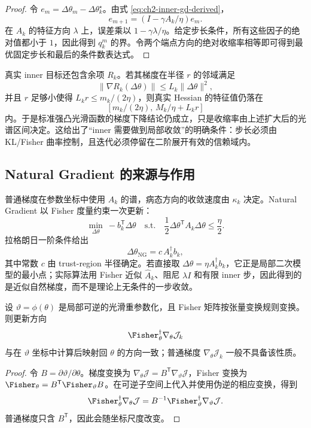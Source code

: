\begin{proof}
令 $e_m=\Delta\theta_m-\Delta\theta_k^\star$。由式 \eqref{eq:ch2-inner-gd-derived}，
\[
e_{m+1}=(I-\gamma A_k/\eta)e_m.
\]
在 $A_k$ 的特征方向 $\lambda$ 上，误差乘以 $1-\gamma\lambda/\eta$。给定步长条件，所有这些因子的绝对值都小于 $1$，因此得到 $q_k^m$ 的界。令两个端点方向的绝对收缩率相等即可得到最优固定步长和最后的条件数表达式。
\end{proof}

真实 inner 目标还包含余项 $R_k$。若其梯度在半径 $r$ 的邻域满足
\[
\|\nabla R_k(\Delta\theta)\|
\leq L_k\|\Delta\theta\|^2,
\]
并且 $r$ 足够小使得 $L_k r\leq m_k/(2\eta)$，则真实 Hessian 的特征值仍落在
\[
[m_k/(2\eta),\,M_k/\eta+L_kr]
\]
内。于是标准强凸光滑函数的梯度下降结论仍成立，只是收缩率由上述扩大后的光谱区间决定。这给出了“inner 需要做到局部收敛”的明确条件：步长必须由 KL/Fisher 曲率控制，且迭代必须停留在二阶展开有效的信赖域内。

\subsection*{Natural Gradient 的来源与作用}

普通梯度在参数坐标中使用 $A_k$ 的谱，病态方向的收敛速度由 $\kappa_k$ 决定。Natural Gradient 以 Fisher 度量约束一次更新：
\begin{equation}
\label{eq:ch2-natural-gradient-subproblem}
\min_{\Delta\theta}\ 
-b_k^{\mathsf T}\Delta\theta
\quad\text{s.t.}\quad
\frac12\Delta\theta^{\mathsf T}A_k\Delta\theta\leq\frac{\eta}{2}.
\end{equation}
拉格朗日一阶条件给出
\[
\Delta\theta_{\mathrm{NG}}
=
c\,A_k^\dagger b_k,
\]
其中常数 $c$ 由 trust-region 半径确定。若直接取 $\Delta\theta=\eta A_k^\dagger b_k$，它正是局部二次模型的最小点；实际算法用 Fisher 近似 $\widehat A_k$、阻尼 $\lambda I$ 和有限 inner 步，因此得到的是近似自然梯度，而不是理论上无条件的一步收敛。

\begin{proposition}
\label{prop:ch2-ng-invariance}
设 $\vartheta=\phi(\theta)$ 是局部可逆的光滑重参数化，且 Fisher 矩阵按张量变换规则变换。则更新方向
\[
\Fisher_\theta^\dagger\nabla_\theta\mathcal J_k
\]
与在 $\vartheta$ 坐标中计算后映射回 $\theta$ 的方向一致；普通梯度 $\nabla_\theta\mathcal J_k$ 一般不具备该性质。
\end{proposition}

\begin{proof}
令 $B=\partial\vartheta/\partial\theta$。梯度变换为 $\nabla_\theta\mathcal J=B^{\mathsf T}\nabla_\vartheta\mathcal J$，Fisher 变换为 $\Fisher_\theta=B^{\mathsf T}\Fisher_\vartheta B$。在可逆子空间上代入并使用伪逆的相应变换，得到
\[
\Fisher_\theta^\dagger\nabla_\theta\mathcal J
=
B^{-1}\Fisher_\vartheta^\dagger\nabla_\vartheta\mathcal J.
\]
普通梯度只含 $B^{\mathsf T}$，因此会随坐标尺度改变。
\end{proof}

